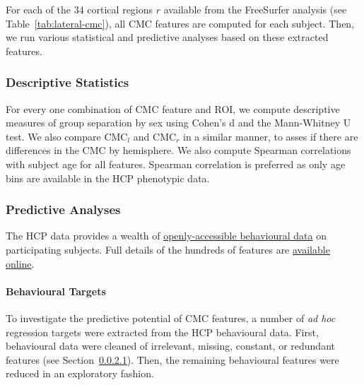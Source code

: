 \documentclass{article}
\begin{document}
For each of the 34 cortical regions \(r\) available from the FreeSurfer
analysis (see Table~\ref{tab:lateral-cmc}), all CMC features are
computed for each subject. Then, we run various statistical and
predictive analyses based on these extracted features.

\subsubsection{Descriptive Statistics}


For every one combination of CMC feature and ROI, we compute descriptive
measures of group separation by sex using Cohen's d and the Mann-Whitney U
test. We also compare \(\text{CMC}_l\) and \(\text{CMC}_r\) in a similar
manner, to asses if there are differences in the \(\text{CMC}\) by
hemisphere. We also compute Spearman correlations with subject age for all
features. Spearman correlation is preferred as only age bins are available in
the HCP phenotypic data.


%




\subsubsection{Predictive Analyses}

The HCP data provides a wealth of
\href{https://www.humanconnectome.org/study/hcp-young-adult/document/wu-minn-hcp-consortium-open-access-data-use-terms}{openly-accessible
behavioural data} on participating subjects. Full details of the hundreds of
features are
\href{https://wiki.humanconnectome.org/docs/HCP-YA%20Data%20Dictionary-%20Updated%20for%20the%201200%20Subject%20Release.html}{available
online}.

\paragraph{Behavioural Targets} \label{sec:cleaning}

To investigate the predictive potential of CMC features, a number of \emph{ad
hoc} regression targets were extracted from the HCP behavioural data.
First, behavioural data were cleaned of irrelevant, missing, constant, or
redundant features (see Section~\ref{sec:cleaning}). Then, the remaining
behavioural features were reduced in an exploratory fashion.
\end{document}
